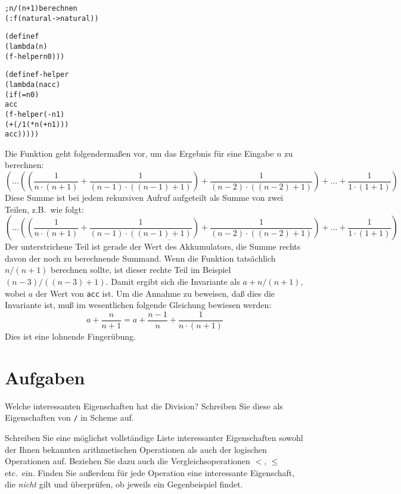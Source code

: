 \begin{alltt}
; n/(n+1) berechnen
(: f (natural -> natural))

(define f
  (lambda (n)
    (f-helper n 0)))

(define f-helper
  (lambda (n acc)
    (if (= n 0)
        acc
        (f-helper (- n 1)
                  (+ (/ 1 (* n (+ n 1)))
                     acc)))))
\end{alltt}
%
Die Funktion geht folgendermaßen vor, um das Ergebnis für eine Eingabe
$n$ zu berechnen:
%
\begin{displaymath}
  (\ldots ((\frac{1}{n \cdot (n + 1)}
  + \frac{1}{(n - 1) \cdot ((n - 1) + 1)})
  + \frac{1}{(n - 2) \cdot ((n - 2) + 1)})
  + \ldots
  + \frac{1}{1 \cdot (1 + 1)})
\end{displaymath}
%
Diese Summe ist bei jedem rekursiven Aufruf aufgeteilt als Summe von
zwei Teilen, z.B.\ wie folgt:
%
\begin{displaymath}
  (\ldots \underline{((\frac{1}{n \cdot (n + 1)}
  + \frac{1}{(n - 1) \cdot ((n - 1) + 1)})
  + \frac{1}{(n - 2) \cdot ((n - 2) + 1)})}
  + \ldots
  + \frac{1}{1 \cdot (1 + 1)})
\end{displaymath}
%
Der unterstrichene Teil ist gerade der Wert des Akkumulators, die
Summe rechts davon der noch zu berechnende Summand.  
Wenn die Funktion tatsächlich $n/(n+1)$ berechnen sollte, ist dieser
rechte Teil im Beispiel $(n-3)/((n-3)+1)$.  Damit ergibt
sich die Invariante als $a + n/(n+1)$, wobei $a$ der Wert von
\texttt{acc} ist.  Um die Annahme zu beweisen, daß dies die Invariante
ist, muß im wesentlichen folgende Gleichung bewiesen werden:
\[a+ \frac{n}{n+1} = a + \frac{n-1}{n} + \frac{1}{n\cdot (n+1)}\]
Dies ist eine lohnende Fingerübung.


\section*{Aufgaben}

\begin{aufgabe}
Welche interessanten Eigenschaften hat die Division?  Schreiben Sie
diese als Eigenschaften von \texttt{/} in Scheme auf.
\end{aufgabe}

\begin{aufgabe}
  Schreiben Sie eine möglichst vollständige Liste interessanter
  Eigenschaften sowohl der Ihnen bekannten arithmetischen Operationen
  als auch der logischen Operationen auf.  Beziehen Sie dazu auch die
  Vergleichsoperationen $<$, $\leq$ etc.\ ein.  Finden Sie außerdem
  für jede Operation eine interessante Eigenschaft, die \emph{nicht}
  gilt und überprüfen, ob \drscheme{} jeweils ein Gegenbeispiel
  findet.
\end{aufgabe}

